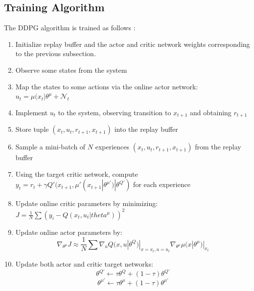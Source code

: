 \subsection{Training Algorithm}
The DDPG algorithm is trained as follows \cite{ddpg}:
\begin{enumerate}
    \item Initialize replay buffer and the actor and critic network weights corresponding to the previous subsection.
    \item Observe some states from the system 
    \item Map the states to some actions via the online actor network: $u_t = \mu (x_t | \theta ^{\mu} + \mathcal{N}_t$
    \item Implement $u_t$ to the system, observing transition to $x_{t+1}$ and obtaining $r_{t+1}$
    \item Store tuple $(x_t, u_t, r_{t+1}, x_{t+1})$ into the replay buffer
    \item Sample a mini-batch of $N$ experiences $(x_t, u_t, r_{t+1}, x_{t+1})$ from the replay buffer
    \item Using the target critic network, compute $y_t = r_t + \gamma Q'(x_{t+1}, \mu'(x_{t+1}|\theta^{\mu'})|\theta ^{Q'})$ for each experience
    \item Update online critic parameters by minimizing: $J = \frac{1}{N}\sum(y_i - Q(x_t, u_t|theta^{\mu}))^2$
    \item Update online actor parameters by:
    $$\nabla_{\theta^{\mu}} J \approx \frac{1}{N}\sum \nabla_u Q(x, u|\theta^Q)|_{x = x_t, u = u_t}\nabla_{\theta^{\mu}}\mu (x | \theta^{\mu})|_{x_t}$$
    \item Update both actor and critic target networks:
    $$\theta^{Q'} \leftarrow \tau \theta^Q + (1 - \tau) \theta^{Q'}$$
    $$\theta^{\mu'} \leftarrow \tau \theta^{\mu} + (1 - \tau) \theta^{\mu'}$$
\end{enumerate}



